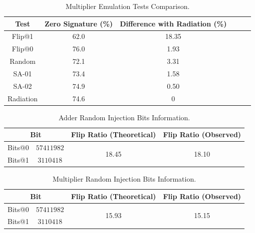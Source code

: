 \begin{table}[tb!]
\center
\caption{Multiplier Emulation Tests Comparison.}
\label{ME}
\begin{tabular}{|c | c| c | c| c| c |} 
 \hline
Test & Zero Signature (\%) & Difference with Radiation (\%)   \\ 
\hline
 
 
 Flip@1& 62.0 &18.35   \\
 \hline
 Flip@0 & 76.0 & 1.93 \\ 
 \hline
 
 Random & 72.1 & 3.31  \\
 \hline
 SA-01 & 73.4 & 1.58 \\
 \hline
 SA-02 & 74.9 &  0.50\\
 \hline
 Radiation & 74.6 & 0  \\
 \hline
 
 
\end{tabular}
\end{table}



\begin{table}[tb!]
\center
\caption{Adder Random Injection Bits Information.}
\label{RI}
\begin{tabular}{c c  c c   } 
 \hline
\multicolumn{2}{c}{Bit}     & Flip Ratio (Theoretical) &  Flip Ratio (Observed)   \\ 
 \hline
 
 Bits@0 & $57 411 982  $ & \multirow{2}{*}{18.45} & \multirow{2}{*}{18.10} \\
 Bits@1 & $3110418$  & &\\ 
 \hline
% 
 
 
\end{tabular}
\end{table}

\begin{table}[tb!]
\center
\caption{Multiplier Random Injection Bits Information.}
\label{RIM}
\begin{tabular}{c c  c c   } 
 \hline
\multicolumn{2}{c}{Bit}     & Flip Ratio (Theoretical) &  Flip Ratio (Observed)   \\ 
 \hline
 
 Bits@0 & $57 411 982  $ & \multirow{2}{*}{15.93} & \multirow{2}{*}{15.15} \\
 Bits@1 & $3110418$  & &\\ 
 \hline
% 
 
 
\end{tabular}
\end{table}



